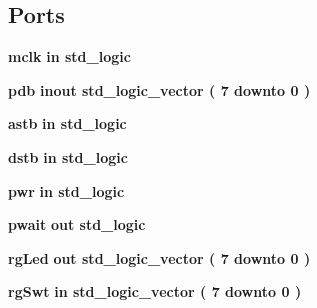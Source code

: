 \subsection*{Ports}
 \begin{DoxyCompactItemize}
\item 
{\bf mclk}  {\bfseries {\bfseries \textcolor{vhdlkeyword}{in}\textcolor{vhdlchar}{ }}} {\bfseries \textcolor{comment}{std\-\_\-logic}\textcolor{vhdlchar}{ }} 
\item 
{\bf pdb}  {\bfseries {\bfseries \textcolor{vhdlkeyword}{inout}\textcolor{vhdlchar}{ }}} {\bfseries \textcolor{comment}{std\-\_\-logic\-\_\-vector}\textcolor{vhdlchar}{ }\textcolor{vhdlchar}{(}\textcolor{vhdlchar}{ }\textcolor{vhdlchar}{ } \textcolor{vhdldigit}{7} \textcolor{vhdlchar}{ }\textcolor{vhdlchar}{ }\textcolor{vhdlchar}{ }\textcolor{vhdlkeyword}{downto}\textcolor{vhdlchar}{ }\textcolor{vhdlchar}{ }\textcolor{vhdlchar}{ } \textcolor{vhdldigit}{0} \textcolor{vhdlchar}{ }\textcolor{vhdlchar}{)}\textcolor{vhdlchar}{ }} 
\item 
{\bf astb}  {\bfseries {\bfseries \textcolor{vhdlkeyword}{in}\textcolor{vhdlchar}{ }}} {\bfseries \textcolor{comment}{std\-\_\-logic}\textcolor{vhdlchar}{ }} 
\item 
{\bf dstb}  {\bfseries {\bfseries \textcolor{vhdlkeyword}{in}\textcolor{vhdlchar}{ }}} {\bfseries \textcolor{comment}{std\-\_\-logic}\textcolor{vhdlchar}{ }} 
\item 
{\bf pwr}  {\bfseries {\bfseries \textcolor{vhdlkeyword}{in}\textcolor{vhdlchar}{ }}} {\bfseries \textcolor{comment}{std\-\_\-logic}\textcolor{vhdlchar}{ }} 
\item 
{\bf pwait}  {\bfseries {\bfseries \textcolor{vhdlkeyword}{out}\textcolor{vhdlchar}{ }}} {\bfseries \textcolor{comment}{std\-\_\-logic}\textcolor{vhdlchar}{ }} 
\item 
{\bf rg\-Led}  {\bfseries {\bfseries \textcolor{vhdlkeyword}{out}\textcolor{vhdlchar}{ }}} {\bfseries \textcolor{comment}{std\-\_\-logic\-\_\-vector}\textcolor{vhdlchar}{ }\textcolor{vhdlchar}{(}\textcolor{vhdlchar}{ }\textcolor{vhdlchar}{ } \textcolor{vhdldigit}{7} \textcolor{vhdlchar}{ }\textcolor{vhdlchar}{ }\textcolor{vhdlchar}{ }\textcolor{vhdlkeyword}{downto}\textcolor{vhdlchar}{ }\textcolor{vhdlchar}{ }\textcolor{vhdlchar}{ } \textcolor{vhdldigit}{0} \textcolor{vhdlchar}{ }\textcolor{vhdlchar}{)}\textcolor{vhdlchar}{ }} 
\item 
{\bf rg\-Swt}  {\bfseries {\bfseries \textcolor{vhdlkeyword}{in}\textcolor{vhdlchar}{ }}} {\bfseries \textcolor{comment}{std\-\_\-logic\-\_\-vector}\textcolor{vhdlchar}{ }\textcolor{vhdlchar}{(}\textcolor{vhdlchar}{ }\textcolor{vhdlchar}{ } \textcolor{vhdldigit}{7} \textcolor{vhdlchar}{ }\textcolor{vhdlchar}{ }\textcolor{vhdlchar}{ }\textcolor{vhdlkeyword}{downto}\textcolor{vhdlchar}{ }\textcolor{vhdlchar}{ }\textcolor{vhdlchar}{ } \textcolor{vhdldigit}{0} \textcolor{vhdlchar}{ }\textcolor{vhdlchar}{)}\textcolor{vhdlchar}{ }} 

\end{DoxyCompactItemize}
